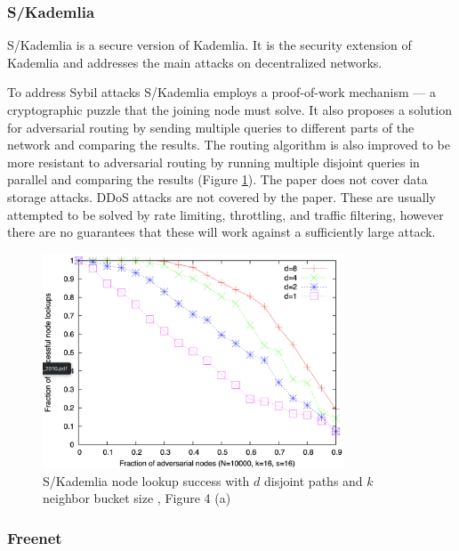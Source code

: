 \subsubsection{S/Kademlia}

S/Kademlia \cite{skademlia} is a secure version of Kademlia.
It is the security extension of Kademlia and addresses the main attacks on decentralized networks.

To address Sybil attacks S/Kademlia employs a proof-of-work mechanism --- a cryptographic puzzle that
the joining node must solve.
It also proposes a solution for adversarial routing by sending multiple queries to different parts
of the network and comparing the results.
The routing algorithm is also improved to be more resistant to adversarial routing
by running multiple disjoint queries in parallel and comparing the results (Figure \ref{fig:skademlia-eval}).
The paper does not cover data storage attacks.
DDoS attacks are not covered by the paper.
These are usually attempted to be solved by rate limiting, throttling, and traffic filtering,
however there are no guarantees that these will work against a sufficiently large attack.

\begin{figure}
    \centering
    \includegraphics[width=0.8\textwidth]{gfx/skademlia-eval.png}
    \caption{S/Kademlia node lookup success with $d$ disjoint paths and $k$ neighbor bucket size \cite{skademlia}, Figure 4 (a)}
    \label{fig:skademlia-eval}
\end{figure}

\subsubsection{Freenet}

